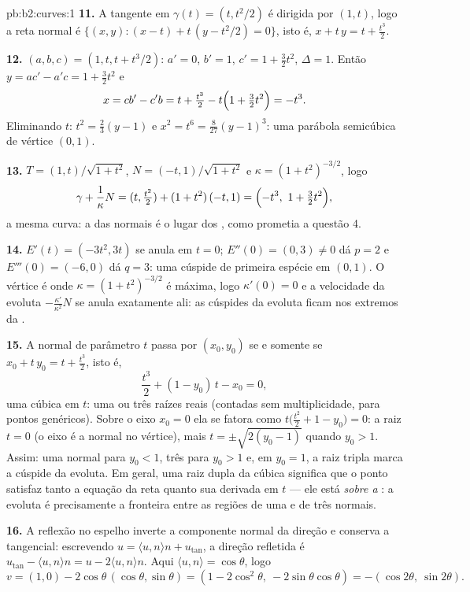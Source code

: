 \begin{solution}{pb:b2:curves:1}
\textbf{11.} A tangente em $\gamma(t) = (t, t^2/2)$ é
dirigida por $(1, t)$, logo a reta normal é $\{(x, y) : (x -
t) + t\,(y - t^2/2) = 0\}$, isto é, $x + t\,y = t +
\tfrac{t^3}2$.

\textbf{12.} $(a, b, c) = (1, t, t + t^3/2)$: $a' = 0$, $b' =
1$, $c' = 1 + \tfrac32 t^2$, $\Delta = 1$. Então $y = ac' -
a'c = 1 + \tfrac32t^2$ e
\[
x = cb' - c'b = t + \tfrac{t^3}2 - t\Bigl(1 +
\tfrac32t^2\Bigr) = -t^3 .
\]
Eliminando $t$: $t^2 = \tfrac23(y - 1)$ e $x^2 = t^6 =
\tfrac8{27}(y - 1)^3$: uma parábola semicúbica de vértice
$(0, 1)$.

\textbf{13.} $T = (1, t)/\sqrt{1+t^2}$, $N = (-t,
1)/\sqrt{1+t^2}$ e $\kappa = (1+t^2)^{-3/2}$, logo
\[
\gamma + \frac1\kappa N = (t, \tfrac{t^2}2) +
(1+t^2)\,(-t, 1) = \Bigl(-t^3,\ 1 + \tfrac32t^2\Bigr),
\]
a mesma curva: a  das normais é o lugar dos
, como prometia a questão 4.

\textbf{14.} $E'(t) = (-3t^2, 3t)$ se anula em $t = 0$;
$E''(0) = (0, 3) \neq 0$ dá $p = 2$ e $E'''(0) = (-6,
0)$ dá $q = 3$: uma cúspide de primeira espécie em $(0, 1)$. O
vértice é onde $\kappa = (1+t^2)^{-3/2}$ é máxima, logo
$\kappa'(0) = 0$ e a velocidade da evoluta
$-\frac{\kappa'}{\kappa^2}N$ se anula exatamente ali: as cúspides
da evoluta ficam nos extremos da .

\textbf{15.} A normal de parâmetro $t$ passa por
$(x_0, y_0)$ se e somente se $x_0 + t\,y_0 = t + \tfrac{t^3}2$, isto é,
\[
\frac{t^3}2 + (1 - y_0)\,t - x_0 = 0 ,
\]
uma cúbica em $t$: uma ou três raízes reais (contadas sem
multiplicidade, para pontos genéricos). Sobre o eixo $x_0 = 0$ ela
se fatora como $t\bigl(\tfrac{t^2}2 + 1 - y_0\bigr) = 0$: a
raiz $t = 0$ (o eixo é a normal no vértice), mais
$t = \pm\sqrt{2(y_0 - 1)}$ quando $y_0 > 1$. Assim: uma normal
para $y_0 < 1$, três para $y_0 > 1$ e, em $y_0 = 1$, a
raiz tripla marca a cúspide da evoluta. Em geral, uma
raiz dupla da cúbica significa que o ponto satisfaz tanto a
equação da reta quanto sua derivada em $t$ --- ele está \emph{sobre a
}: a evoluta é precisamente a fronteira entre as
regiões de uma e de três normais.

\textbf{16.} A reflexão no espelho inverte a componente normal
da direção e conserva a tangencial:
escrevendo $u = \langle u, n\rangle n + u_{\mathrm{tan}}$, a
direção refletida é $u_{\mathrm{tan}} - \langle u,
n\rangle n = u - 2\langle u, n\rangle n$. Aqui $\langle u,
n\rangle = \cos\theta$, logo
\[
v = (1, 0) - 2\cos\theta\,(\cos\theta, \sin\theta)
= (1 - 2\cos^2\theta,\ -2\sin\theta\cos\theta)
= -(\cos2\theta,\ \sin2\theta).
\]


\end{solution}
